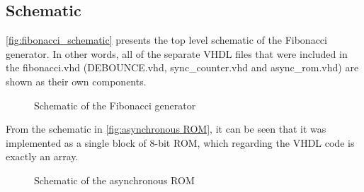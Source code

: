 \documentclass[10pt]{article}
\begin{document}
\subsection{Schematic}

\autoref{fig:fibonacci_schematic} presents the top level schematic of the Fibonacci generator. In other words, all of the separate VHDL files that were included in the fibonacci.vhd (DEBOUNCE.vhd, sync\_counter.vhd and async\_rom.vhd) are shown as their own components.
 \begin{figure}[ht]
    \centering
    \caption{Schematic of the Fibonacci generator}
    \label{fig:fibonacci_schematic}
\end{figure}

From the schematic in \autoref{fig:asynchronous ROM}, it can be seen that it was implemented as a single block of 8-bit ROM, which regarding the VHDL code is exactly an array.
\begin{figure}[ht]
    \centering
    \caption{Schematic of the asynchronous ROM}
    \label{fig:asynchronous ROM}
\end{figure}
\newpage
\end{document}
